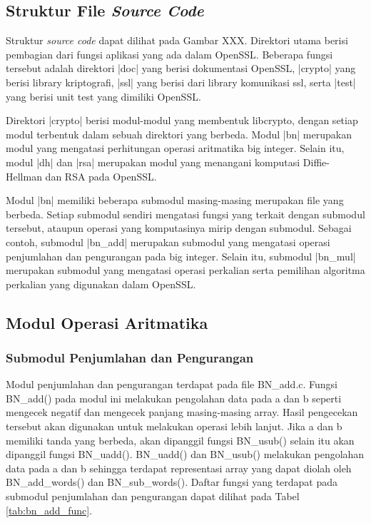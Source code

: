 
\subsection{Struktur File \textit{Source Code}}


Struktur \textit{source code} dapat dilihat pada Gambar XXX. Direktori utama berisi pembagian dari fungsi aplikasi yang ada dalam OpenSSL. Beberapa fungsi tersebut adalah direktori |doc| yang berisi dokumentasi OpenSSL, |crypto| yang berisi library kriptografi, |ssl| yang berisi dari library komunikasi ssl, serta |test| yang berisi unit test yang dimiliki OpenSSL.

Direktori |crypto| berisi modul-modul yang membentuk libcrypto, dengan setiap modul terbentuk dalam sebuah direktori yang berbeda. Modul |bn| merupakan modul yang mengatasi perhitungan operasi aritmatika big integer. Selain itu, modul |dh| dan |rsa| merupakan modul yang menangani komputasi Diffie-Hellman dan RSA pada OpenSSL.

Modul |bn| memiliki beberapa submodul masing-masing merupakan file yang berbeda. Setiap submodul sendiri mengatasi fungsi yang terkait dengan submodul tersebut, ataupun operasi yang komputasinya mirip dengan submodul. Sebagai contoh, submodul |bn_add| merupakan submodul yang mengatasi operasi penjumlahan dan pengurangan pada big integer. Selain itu, submodul |bn_mul| merupakan submodul yang mengatasi operasi perkalian serta pemilihan algoritma perkalian yang digunakan dalam OpenSSL.

\subsection{Modul Operasi Aritmatika}
\subsubsection{Submodul Penjumlahan dan Pengurangan}
Modul penjumlahan dan pengurangan terdapat pada file BN\_add.c. Fungsi BN\_add() pada modul ini melakukan pengolahan data pada a dan b seperti mengecek negatif dan mengecek panjang masing-masing array. Hasil pengecekan tersebut akan digunakan untuk melakukan operasi lebih lanjut. Jika a dan b memiliki tanda yang berbeda, akan dipanggil fungsi BN\_usub() selain itu akan dipanggil fungsi BN\_uadd(). BN\_uadd() dan BN\_usub() melakukan pengolahan data pada a dan b sehingga terdapat representasi array yang dapat diolah oleh BN\_add\_words() dan BN\_sub\_words(). Daftar fungsi yang terdapat pada submodul penjumlahan dan pengurangan dapat dilihat pada Tabel \ref{tab:bn_add_func}.

